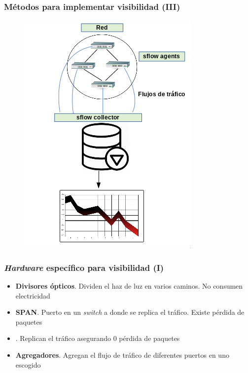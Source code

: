 \documentclass{beamer}
\begin{document}
\begin{frame}
\frametitle{Métodos para implementar visibilidad (III)}

\begin{figure}[H]
	\centering
	\includegraphics[scale=0.5]{sflow.png}
	\label{sflow}
\end{figure}

\end{frame}

\begin{frame}

\frametitle{\textit{Hardware} específico para visibilidad (I)}

\begin{itemize}
	\item \textbf{Divisores ópticos}. Dividen el haz de luz en varios caminos. No consumen electricidad
	\item \textbf{SPAN}. Puerto en un \textit{switch} a donde se replica el tráfico. Existe pérdida de paquetes
	\item \textbf{\color{purple}{TAP}}. Replican el tráfico asegurando 0 pérdida de paquetes
	\item \textbf{Agregadores}. Agregan el flujo de tráfico de diferentes puertos en uno escogido
\end{itemize}

\end{frame}
\end{document}
